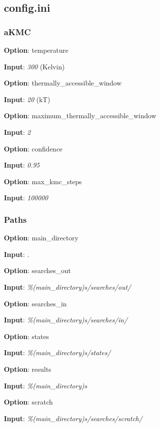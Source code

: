 \documentclass{article}
\begin{document}
\subsection{config.ini}

\subsubsection{aKMC}

\noindent\textbf{Option}:  temperature

\noindent\textbf{Input}:  \emph{300} (Kelvin)

\noindent\textbf{Option}:  thermally\_accessible\_window

\noindent\textbf{Input}:  \emph{20} (kT)

\noindent\textbf{Option}:  maximum\_thermally\_accessible\_window

\noindent\textbf{Input}:  \emph{2}

\noindent\textbf{Option}:  confidence

\noindent\textbf{Input}:  \emph{0.95}

\noindent\textbf{Option}:  max\_kmc\_steps

\noindent\textbf{Input}:  \emph{100000}

\subsubsection{Paths}

\noindent\textbf{Option}:  main\_directory

\noindent\textbf{Input}:  \emph{.}

\noindent\textbf{Option}:  searches\_out

\noindent\textbf{Input}:  \emph{\%(main\_directory)s/searches/out/}

\noindent\textbf{Option}:  searches\_in

\noindent\textbf{Input}:  \emph{\%(main\_directory)s/searches/in/}

\noindent\textbf{Option}:  states

\noindent\textbf{Input}:  \emph{\%(main\_directory)s/states/}

\noindent\textbf{Option}:  results

\noindent\textbf{Input}:  \emph{\%(main\_directory)s}

\noindent\textbf{Option}:  scratch

\noindent\textbf{Input}:  \emph{\%(main\_directory)s/searches/scratch/}
\end{document}

